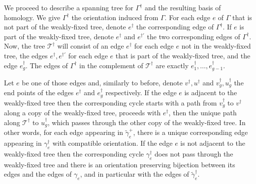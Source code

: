 \documentclass[11pt]{article}
\theoremstyle{definition}
\numberwithin{equation}{section}
\theoremstyle{definition}
\newcommand{\calT}{\mathcal{T}}
\newcommand{\wt}[1]{\widetilde{#1}}
\begin{document}
We proceed to describe a spanning tree for $\Gamma^{\dagger}$ and the resulting basis of homology. We give $\Gamma^{\dagger}$ the orientation induced from $\Gamma$. 
For each edge $e$ of $\Gamma$ that is not part of the weakly-fixed tree, denote $e^{\dagger}$  the corresponding edge of $\Gamma^{\dagger}$. If $e$ is part of the weakly-fixed tree, denote $e^{\dagger}$ and $e^{\dagger'}$ the two corresponding edges of $\Gamma^{\dagger}$. Now, the tree $\calT^{\dagger}$ will consist of an edge $e^{\dagger}$ for each edge $e$ not in the weakly-fixed tree, the edges $e^{\dagger},e^{\dagger'}$ for each edge $e$ that is part of the weakly-fixed tree, and the edge $e_g^{\dagger}$. The edges of $\Gamma^{\dagger}$ in the complement of $\calT^{\dagger}$ are exactly $e_1^{\dagger},\ldots,e_{g-1}^{\dagger}$. 

Let $e$ be one of those edges and, similarly to before, denote $v^{\dagger}, u^{\dagger}$ and $v_g^{\dagger}, u_g^{\dagger}$ the end points of the edges $e^{\dagger}$ and $e_g^{\dagger}$ respectively. 
If the edge $e$ is adjacent to the weakly-fixed tree then the corresponding cycle starts with a path from $v_g^{\dagger}$ to $v^{\dagger}$ along a copy of the weakly-fixed tree, proceeds with $e^{\dagger}$,  then the unique path along $\calT^{\dagger}$ to $u_g^{\dagger}$, which passes through the other copy of the weakly-fixed tree. 
In other words, for each edge appearing in $\wt\gamma_e^+$, there is a unique corresponding edge appearing in $\gamma_e^{\dagger}$ with compatible orientation. If the edge $e$ is not adjacent to the weakly-fixed tree then the corresponding cycle $\gamma_e^{\dagger}$ does not pass through the weakly-fixed tree and there is an orientation preserving bijection between its edges and the edges of $\gamma_e$, and in particular with the edges of $\wt\gamma_e^{\dagger}$. 



 
\end{document}
